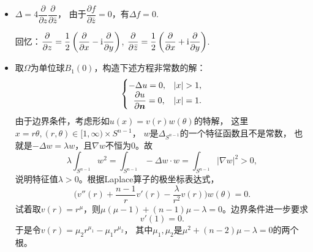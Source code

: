 \begin{itemize}
\begin{proof}
\begin{align*}
    &=\frac{1}{r^{n-1}\sqrt{\det g_{S^{n-1}}}}\bigg[
    \frac{\partial}{\partial r}\Big(r^{n-1}\sqrt{\det g_{S^{n-1}}}\frac{\partial f}{\partial r}\Big)
    +\sum_{k,l}\frac{\partial}{\partial\theta^k}
    \Big(r^{n-1}\sqrt{\det g_{S^{n-1}}}\frac{g^{kl}_{S^{n-1}}}{r^2}\frac{\partial f}{\partial\theta^l}\Big)\bigg]\\
    &=\frac{1}{r^{n-1}}\frac{\partial}{\partial r}\Big(r^{n-1}\frac{\partial f}{\partial r}\Big)
    +\frac{1}{r^2\sqrt{\det g_{S^{n-1}}}}\sum_{k,l}\frac{\partial}{\partial\theta^k}
    \Big(\sqrt{\det g_{S^{n-1}}}g_{S^{n-1}}^{kl}\frac{\partial f}{\partial\theta^l}\Big)\\
    &=\frac{\partial^2 f}{\partial r^2}+\frac{n-1}{r}\frac{\partial f}{\partial r}+\frac{1}{r^2}\Delta_{S^{n-1}}f.
    \end{align*}
    相关的前置知识和更为一般的结果参考\cite{Gr} Chapter 3，尤其是3.9 \& 10。
\end{proof}

    \item[4.]
    $\Delta=4\dfrac{\partial}{\partial z}\dfrac{\partial}{\partial\bar{z}}$，
    由于$\dfrac{\partial f}{\partial\bar{z}}=0$，有$\Delta f=0$.

    回忆：$\dfrac{\partial}{\partial z}
    =\dfrac{1}{2}\left(\dfrac{\partial}{\partial x}
    -{\rm i}\dfrac{\partial}{\partial y}\right)$, 
    $\dfrac{\partial}{\partial\bar{z}}
    =\dfrac{1}{2}\left(\dfrac{\partial}{\partial x}
    +{\rm i}\dfrac{\partial}{\partial y}\right)$.

	\item[6.]
    取$\varOmega$为单位球$B_1(0)$，构造下述方程非常数的解：
	$$\begin{cases}
        -\Delta u=0,&|x|>1,\\
        \hspace{0.55em}\dfrac{\partial u}{\partial\boldsymbol{n}}=0,&|x|=1.
    \end{cases}$$
    由于边界条件，考虑形如$u(x)=v(r)w(\theta)$的特解，
    这里$x=r\theta,(r,\theta)\in[1,\infty)\times S^{n-1}$，
    $w$是$\Delta_{S^{n-1}}$的一个特征函数且不是常数，
    也就是$-\Delta w=\lambda w$，且$\nabla w$不恒为$0$。故
    $$\lambda\int_{S^{n-1}}w^2=\int_{S^{n-1}}-\Delta w\cdot w
    =\int_{S^{n-1}}|\nabla w|^2>0,$$
    说明特征值$\lambda>0$。根据Laplace算子的极坐标表达式，
    $$\Big(v''(r)+\frac{n-1}{r}v'(r)-\frac{\lambda}{r^2}v(r)\Big)w(\theta)=0.$$
    试着取$v(r)=r^\mu$，则$\mu(\mu-1)+(n-1)\mu-\lambda=0$。边界条件进一步要求
    $$v'(1)=0.$$
    于是令$v(r)=\mu_2r^{\mu_1}-\mu_1r^{\mu_2}$，
    其中$\mu_1,\mu_2$是$\mu^2+(n-2)\mu-\lambda=0$的两个根。


\end{itemize}

